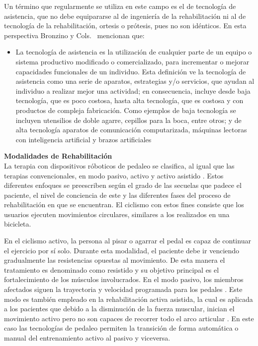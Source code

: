 \vspace{10pt}
Un término que regularmente se utiliza en este campo es el de tecnología de asistencia, que
no debe equipararse al de ingeniería de la rehabilitación ni al de tecnología de la rehabilitación, ortesis o 
prótesis, pues no son idénticos. En esta perspectiva Bronzino y Cols.~\cite{enderle2012introduction}  mencionan que:

\begin{itemize}
    \item  La tecnología de asistencia es la utilización de cualquier parte de un equipo o sistema productivo modificado o comercializado, para incrementar o mejorar capacidades funcionales de un individuo. Esta definición ve
    la tecnología de asistencia como una serie de aparatos, estrategias y/o servicios, que ayudan al individuo a realizar mejor una actividad; en consecuencia, incluye desde baja
    tecnología, que es poco costosa, hasta alta tecnología, que es costosa y con productos de compleja fabricación. Como ejemplos de baja
    tecnología se incluyen utensilios de doble agarre, cepillos para la boca, entre otros; y de
    alta tecnología aparatos de comunicación computarizada, máquinas lectoras con inteligencia artificial y brazos artificiales
\end{itemize}

\vspace{10pt}
\textbf{Modalidades de Rehabilitación} \\ 
La terapia con dispositivos róboticos de pedaleo se clasifica, al igual que las terapias
convencionales, en modo pasivo, activo y activo asistido \cite{barclay2019effect}. Estos diferentes enfoques
se preescriben según el grado de las secuelas que padece el paciente, el nivel de
conciencia de este y las diferentes fases del proceso de rehabilitación en que se
encuentran. El ciclismo con estos fines consiste que los usuarios ejecuten movimientos
circulares, similares a los realizados en una bicicleta.

\vspace{5pt}
En el ciclismo activo, la persona al pisar o agarrar el pedal es capaz de continuar el
ejercicio por sí solo. Durante esta modalidad, el paciente debe ir venciendo gradualmente
las resistencias opuestas al movimiento. De esta manera el tratamiento es denominado
como resistido y su objetivo principal es el fortalecimiento de los músculos involucrados.
En el modo pasivo, los miembros afectados siguen la trayectoria y velocidad programada
para los pedales \cite{ferreira2020virtual}. Este modo es también empleado en la rehabilitación activa asistida,
la cual es aplicada a los pacientes que debido a la disminución de la fuerza muscular,
inician el movimiento activo pero no son capaces de recorrer todo el arco articular \cite{cruz2009guia}.
En este caso las tecnologías de pedaleo permiten la transición de forma automática o
manual del entrenamiento activo al pasivo y viceversa.

